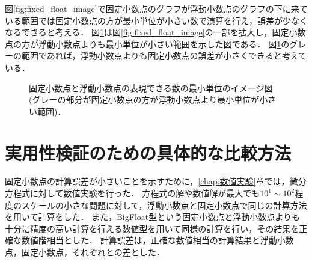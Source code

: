 図\ref{fig:fixed_float_image}で固定小数点のグラフが浮動小数点のグラフの下に来ている範囲では固定小数点の方が最小単位が小さい数で演算を行え，誤差が少なくなるできると考える．
図\ref{fig:fixed_float_image_zoom}は図\ref{fig:fixed_float_image}の一部を拡大し，固定小数点の方が浮動小数点よりも最小単位が小さい範囲を示した図である．
図\ref{fig:fixed_float_image_zoom}のグレーの範囲であれば，浮動小数点よりも固定小数点の誤差が小さくできると考えている．

\begin{figure}[H]
    \centering
    \caption{固定小数点と浮動小数点の表現できる数の最小単位のイメージ図(グレーの部分が固定小数点の方が浮動小数点より最小単位が小さい範囲)．}
    \label{fig:fixed_float_image_zoom}
\end{figure}

\section{実用性検証のための具体的な比較方法}
固定小数点の計算誤差が小さいことを示すために，\ref{chap:数値実験}章では，微分方程式に対して数値実験を行った．
方程式の解や数値解が最大でも$10^1 \sim 10^2$程度のスケールの小さな問題に対して，浮動小数点と固定小数点で同じの計算方法を用いて計算をした．
また，BigFloat型という固定小数点と浮動小数点よりも十分に精度の高い計算を行える数値型を用いて同様の計算を行い，その結果を正確な数値階相当とした．
計算誤差は，正確な数値相当の計算結果と浮動小数点，固定小数点，それぞれとの差とした．
\begin{comment}
    ストーリー：
    固定小数点演算は浮動小数点演算よりも計算時間が速いとされている．
    しかし，浮動小数点に比べて精度が低くなる恐れがある．
    本論文では，固定小数点と浮動小数点での数値計算の結果を比べ，固定小数点での演算も浮動小数点と同程度の精度で計算できることを示した．
    実験結果より固定小数点演算で浮動小数点より高速で，浮動小数点と同程度の計算を実現できるのではないかと考える．
\end{comment}


